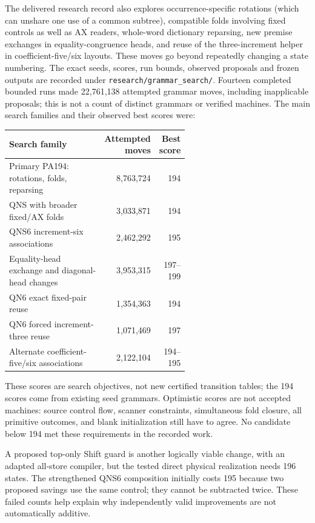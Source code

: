 \documentclass[11pt,letterpaper]{article}
\newcommand{\file}[1]{\texttt{\nolinkurl{#1}}}
\begin{document}
The delivered research record also explores occurrence-specific rotations
(which can unshare one use of a common subtree), compatible folds involving
fixed controls as well as AX readers, whole-word dictionary reparsing,
new premise exchanges in equality-congruence heads, and reuse of the
three-increment helper in coefficient-five/six layouts. These moves go
beyond repeatedly changing a state numbering. The exact seeds, scores,
run bounds, observed proposals and frozen outputs are recorded under
\file{research/grammar_search/}. Fourteen completed bounded runs made
22,761,138 attempted grammar moves, including inapplicable proposals;
this is not a count of distinct grammars or verified machines.
The main search families and their observed best scores were:
\begin{center}\small
\begin{tabular}{@{}p{0.59\linewidth}rr@{}}
\toprule Search family &Attempted moves&Best score\\\midrule
Primary PA194: rotations, folds, reparsing &8,763,724&194\\
QNS with broader fixed/AX folds &3,033,871&194\\
QNS6 increment-six associations &2,462,292&195\\
Equality-head exchange and diagonal-head changes &3,953,315&197--199\\
QN6 exact fixed-pair reuse &1,354,363&194\\
QN6 forced increment-three reuse &1,071,469&197\\
Alternate coefficient-five/six associations &2,122,104&194--195\\
\bottomrule
\end{tabular}
\end{center}
These scores are search objectives, not new certified transition tables;
the 194 scores come from existing seed grammars. Optimistic scores are not
accepted machines:
source control flow, scanner constraints, simultaneous fold closure, all
primitive outcomes, and blank initialization still have to agree.
No candidate below 194 met these requirements in the recorded work.

A proposed top-only Shift guard is another logically viable change, with
an adapted all-store compiler, but the tested direct physical realization
needs 196 states. The strengthened QNS6 composition initially costs 195
because two proposed savings use the same control; they cannot be subtracted
twice. These failed counts help explain why independently valid improvements
are not automatically additive.
\end{document}
